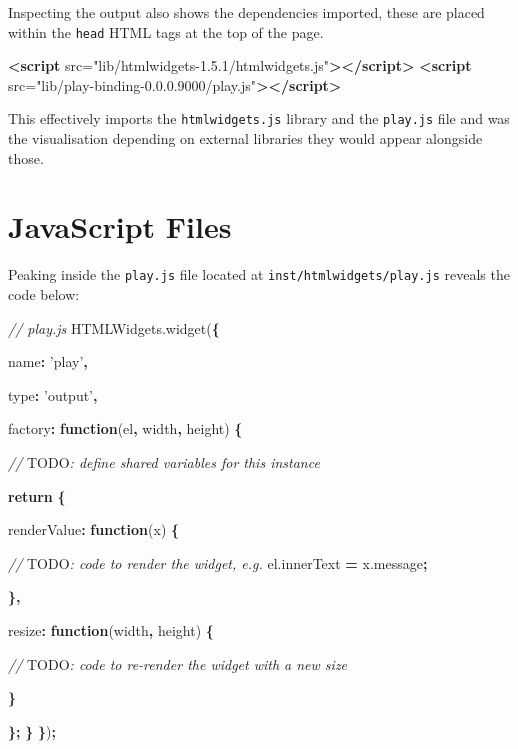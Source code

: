 \documentclass[10pt,]{krantz}
\makeatletter
\newenvironment{Shaded}{\begin{snugshade}}{\end{snugshade}}
\newcommand{\AlertTok}[1]{\textcolor[rgb]{0.33,0.33,0.33}{#1}}
\newcommand{\AttributeTok}[1]{\textcolor[rgb]{0.61,0.61,0.61}{#1}}
\newcommand{\CommentTok}[1]{\textcolor[rgb]{0.37,0.37,0.37}{\textit{#1}}}
\newcommand{\ControlFlowTok}[1]{\textcolor[rgb]{0.27,0.27,0.27}{\textbf{#1}}}
\newcommand{\DataTypeTok}[1]{\textcolor[rgb]{0.27,0.27,0.27}{#1}}
\newcommand{\KeywordTok}[1]{\textcolor[rgb]{0.27,0.27,0.27}{\textbf{#1}}}
\newcommand{\NormalTok}[1]{#1}
\newcommand{\OperatorTok}[1]{\textcolor[rgb]{0.43,0.43,0.43}{\textbf{#1}}}
\newcommand{\OtherTok}[1]{\textcolor[rgb]{0.37,0.37,0.37}{#1}}
\newcommand{\StringTok}[1]{\textcolor[rgb]{0.5,0.5,0.5}{#1}}
\newcommand{\VariableTok}[1]{\textcolor[rgb]{0,0,0}{#1}}
\newenvironment{kframe}{%
\medskip{}
\setlength{\fboxsep}{.8em}
 \def\at@end@of@kframe{}%
 \ifinner\ifhmode%
  \def\at@end@of@kframe{\end{minipage}}%
  \begin{minipage}{\columnwidth}%
 \fi\fi%
 \def\FrameCommand##1{\hskip\@totalleftmargin \hskip-\fboxsep
 \colorbox{shadecolor}{##1}\hskip-\fboxsep
     \hskip-\linewidth \hskip-\@totalleftmargin \hskip\columnwidth}%
 \MakeFramed {\advance\hsize-\width
   \@totalleftmargin\z@ \linewidth\hsize
   \@setminipage}}%
 {\par\unskip\endMakeFramed%
 \at@end@of@kframe}
\renewenvironment{Shaded}{\begin{kframe}}{\end{kframe}}
\makeatother
\begin{document}
Inspecting the output also shows the dependencies imported, these are placed within the \texttt{head} HTML tags at the top of the page.

\begin{Shaded}
\begin{Highlighting}[]
\KeywordTok{<script}\OtherTok{ src=}\StringTok{"lib/htmlwidgets-1.5.1/htmlwidgets.js"}\KeywordTok{></script>}
\KeywordTok{<script}\OtherTok{ src=}\StringTok{"lib/play-binding-0.0.0.9000/play.js"}\KeywordTok{></script>}
\end{Highlighting}
\end{Shaded}

This effectively imports the \texttt{htmlwidgets.js} library and the \texttt{play.js} file and was the visualisation depending on external libraries they would appear alongside those.

\hypertarget{widgets-first-js-files}{%
\section{JavaScript Files}\label{widgets-first-js-files}}

Peaking inside the \texttt{play.js} file located at \texttt{inst/htmlwidgets/play.js} reveals the code below:

\begin{Shaded}
\begin{Highlighting}[]
\CommentTok{// play.js}
\VariableTok{HTMLWidgets}\NormalTok{.}\AttributeTok{widget}\NormalTok{(}\OperatorTok{\{}

  \DataTypeTok{name}\OperatorTok{:} \StringTok{'play'}\OperatorTok{,}

  \DataTypeTok{type}\OperatorTok{:} \StringTok{'output'}\OperatorTok{,}

  \DataTypeTok{factory}\OperatorTok{:} \KeywordTok{function}\NormalTok{(el}\OperatorTok{,}\NormalTok{ width}\OperatorTok{,}\NormalTok{ height) }\OperatorTok{\{}

    \CommentTok{// }\AlertTok{TODO}\CommentTok{: define shared variables for this instance}

    \ControlFlowTok{return} \OperatorTok{\{}

      \DataTypeTok{renderValue}\OperatorTok{:} \KeywordTok{function}\NormalTok{(x) }\OperatorTok{\{}

        \CommentTok{// }\AlertTok{TODO}\CommentTok{: code to render the widget, e.g.}
        \VariableTok{el}\NormalTok{.}\AttributeTok{innerText} \OperatorTok{=} \VariableTok{x}\NormalTok{.}\AttributeTok{message}\OperatorTok{;}

      \OperatorTok{\},}

      \DataTypeTok{resize}\OperatorTok{:} \KeywordTok{function}\NormalTok{(width}\OperatorTok{,}\NormalTok{ height) }\OperatorTok{\{}

        \CommentTok{// }\AlertTok{TODO}\CommentTok{: code to re-render the widget with a new size}

      \OperatorTok{\}}

    \OperatorTok{\};}
  \OperatorTok{\}}
\OperatorTok{\}}\NormalTok{)}\OperatorTok{;}
\end{Highlighting}
\end{Shaded}
\end{document}

